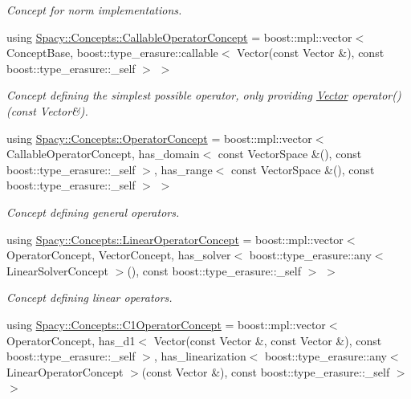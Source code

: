 \begin{DoxyCompactItemize}
\begin{DoxyCompactList}\small\item\em Concept for norm implementations. \end{DoxyCompactList}\item 
using \hyperlink{group__ConceptGroup_gadec0c664abaacc2065dadd8b11cc8d30_gadec0c664abaacc2065dadd8b11cc8d30}{Spacy\+::\+Concepts\+::\+Callable\+Operator\+Concept} = boost\+::mpl\+::vector$<$ Concept\+Base, boost\+::type\+\_\+erasure\+::callable$<$ Vector(const Vector \&), const boost\+::type\+\_\+erasure\+::\+\_\+self $>$ $>$
\begin{DoxyCompactList}\small\item\em Concept defining the simplest possible operator, only providing \hyperlink{classSpacy_1_1Vector}{Vector} operator()(const Vector\&). \end{DoxyCompactList}\item 
using \hyperlink{group__ConceptGroup_ga7d984281b647a6d8e4c0a7ea5faeb90e_ga7d984281b647a6d8e4c0a7ea5faeb90e}{Spacy\+::\+Concepts\+::\+Operator\+Concept} = boost\+::mpl\+::vector$<$ Callable\+Operator\+Concept, has\+\_\+domain$<$ const Vector\+Space \&(), const boost\+::type\+\_\+erasure\+::\+\_\+self $>$, has\+\_\+range$<$ const Vector\+Space \&(), const boost\+::type\+\_\+erasure\+::\+\_\+self $>$ $>$
\begin{DoxyCompactList}\small\item\em Concept defining general operators. \end{DoxyCompactList}\item 
using \hyperlink{group__ConceptGroup_gaf0e18e41c434cfceb77ccb8e785a8055_gaf0e18e41c434cfceb77ccb8e785a8055}{Spacy\+::\+Concepts\+::\+Linear\+Operator\+Concept} = boost\+::mpl\+::vector$<$ Operator\+Concept, Vector\+Concept, has\+\_\+solver$<$ boost\+::type\+\_\+erasure\+::any$<$ Linear\+Solver\+Concept $>$(), const boost\+::type\+\_\+erasure\+::\+\_\+self $>$ $>$
\begin{DoxyCompactList}\small\item\em Concept defining linear operators. \end{DoxyCompactList}\item 
using \hyperlink{group__ConceptGroup_ga14a12c741dc237e32862fa4bc315451b_ga14a12c741dc237e32862fa4bc315451b}{Spacy\+::\+Concepts\+::\+C1\+Operator\+Concept} = boost\+::mpl\+::vector$<$ Operator\+Concept, has\+\_\+d1$<$ Vector(const Vector \&, const Vector \&), const boost\+::type\+\_\+erasure\+::\+\_\+self $>$, has\+\_\+linearization$<$ boost\+::type\+\_\+erasure\+::any$<$ Linear\+Operator\+Concept $>$(const Vector \&), const boost\+::type\+\_\+erasure\+::\+\_\+self $>$ $>$

\end{DoxyCompactItemize}
